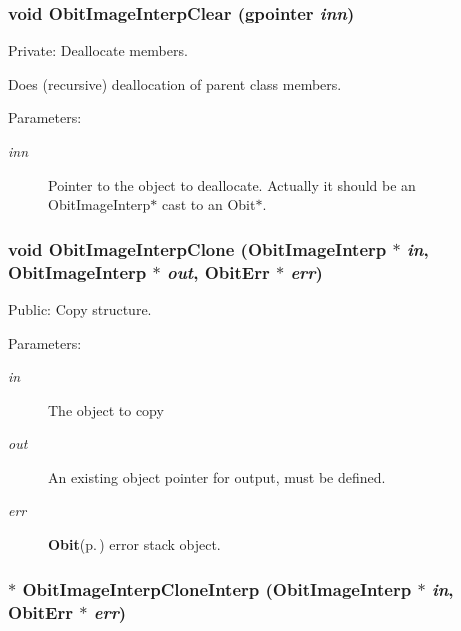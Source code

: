 \subsubsection{\setlength{\rightskip}{0pt plus 5cm}void Obit\-Image\-Interp\-Clear (gpointer {\em inn})}\label{ObitImageInterp_8c_a4}


Private: Deallocate members. 

Does (recursive) deallocation of parent class members. \begin{Desc}
\item[Parameters:]
\begin{description}
\item[{\em inn}]Pointer to the object to deallocate. Actually it should be an Obit\-Image\-Interp$\ast$ cast to an Obit$\ast$. \end{description}
\end{Desc}
\subsubsection{\setlength{\rightskip}{0pt plus 5cm}void Obit\-Image\-Interp\-Clone ({\bf Obit\-Image\-Interp} $\ast$ {\em in}, {\bf Obit\-Image\-Interp} $\ast$ {\em out}, {\bf Obit\-Err} $\ast$ {\em err})}\label{ObitImageInterp_8c_a10}


Public: Copy structure. 

\begin{Desc}
\item[Parameters:]
\begin{description}
\item[{\em in}]The object to copy \item[{\em out}]An existing object pointer for output, must be defined. \item[{\em err}]{\bf Obit}{\rm (p.\,\pageref{structObit})} error stack object. \end{description}
\end{Desc}
\subsubsection{$\ast$ Obit\-Image\-Interp\-Clone\-Interp ({\bf Obit\-Image\-Interp} $\ast$ {\em in}, {\bf Obit\-Err} $\ast$ {\em err})}\label{ObitImageInterp_8c_a15}


